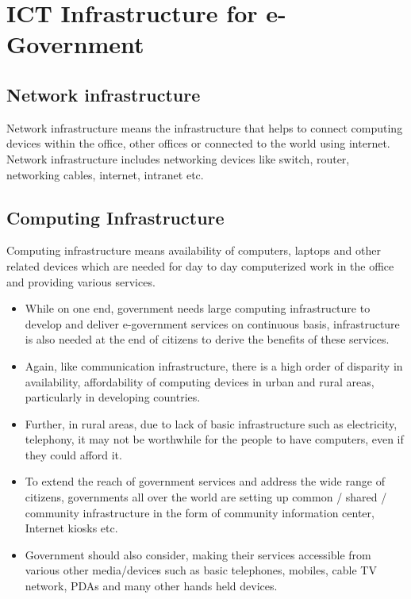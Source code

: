 \chapter{ICT Infrastructure for e-Government}


\section{Network infrastructure}
Network infrastructure means the infrastructure that helps to connect computing devices within the office, other offices or connected to the world using internet. Network infrastructure includes networking devices like switch, router, networking cables, internet, intranet etc.

\section{Computing Infrastructure}
Computing infrastructure means availability of computers, laptops and other related devices which are needed for day to day computerized work in the office and providing various services.

\begin{itemize}
	\item While on one end, government needs large computing infrastructure to develop and deliver e-government services on continuous basis, infrastructure is also needed at the end of citizens to derive the benefits of these services.
	
	\item Again, like communication infrastructure, there is a high order of disparity in availability, affordability of computing devices in urban and rural areas, particularly in developing countries.
	
	\item Further, in rural areas, due to lack of basic infrastructure such as electricity, telephony, it may not be worthwhile for the people to have computers, even if they could afford it.
	
	\item To extend the reach of government services and address the wide range of citizens, governments all over the world are setting up common / shared / community infrastructure in the form of community information center, Internet kiosks etc.
	
	\item Government should also consider, making their services accessible from various other media/devices such as basic telephones, mobiles, cable TV network, PDAs and many other hands held devices.
	
\end{itemize}
